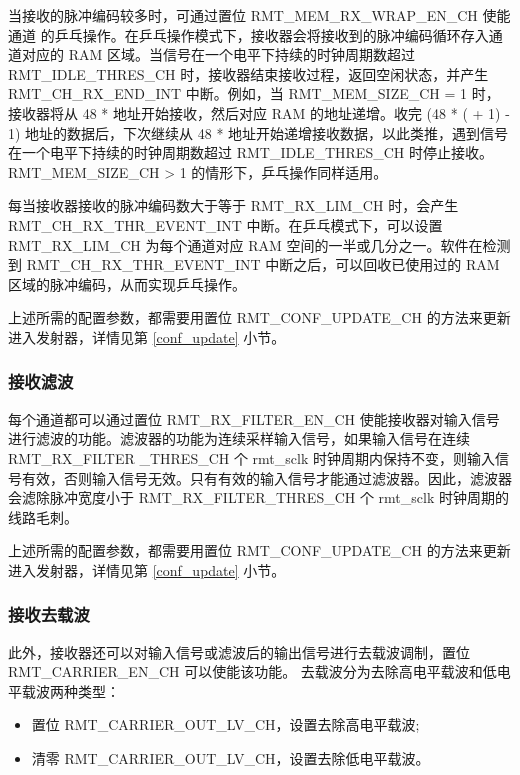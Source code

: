 \documentclass[main\_\_CN.tex]{subfiles}
\begin{document}
当接收的脉冲编码较多时，可通过置位 RMT\_MEM\_RX\_WRAP\_EN\_CH 使能通道  的乒乓操作。在乒乓操作模式下，接收器会将接收到的脉冲编码循环存入通道对应的 RAM 区域。当信号在一个电平下持续的时钟周期数超过 RMT\_IDLE\_THRES\_CH 时，接收器结束接收过程，返回空闲状态，并产生 RMT\_CH\_RX\_END\_INT 中断。例如，当 RMT\_MEM\_SIZE\_CH = 1 时，接收器将从 48 *  地址开始接收，然后对应 RAM 的地址递增。收完 (48 * ( + 1) - 1) 地址的数据后，下次继续从 48 *  地址开始递增接收数据，以此类推，遇到信号在一个电平下持续的时钟周期数超过 RMT\_IDLE\_THRES\_CH 时停止接收。RMT\_MEM\_SIZE\_CH > 1 的情形下，乒乓操作同样适用。

每当接收器接收的脉冲编码数大于等于 RMT\_RX\_LIM\_CH 时，会产生
RMT\_CH\_RX\_THR\_EVENT\_INT 中断。在乒乓模式下，可以设置 RMT\_RX\_LIM\_CH
为每个通道对应 RAM 空间的一半或几分之一。软件在检测到 RMT\_CH\_RX\_THR\_EVENT\_INT
中断之后，可以回收已使用过的 RAM 区域的脉冲编码，从而实现乒乓操作。

上述所需的配置参数，都需要用置位 RMT\_CONF\_UPDATE\_CH 的方法来更新进入发射器，详情见第 \ref{conf_update} 小节。



\subsubsection{接收滤波}

每个通道都可以通过置位 RMT\_RX\_FILTER\_EN\_CH 使能接收器对输入信号进行滤波的功能。滤波器的功能为连续采样输入信号，如果输入信号在连续 RMT\_RX\_FILTER \_THRES\_CH 个 rmt\_sclk 时钟周期内保持不变，则输入信号有效，否则输入信号无效。只有有效的输入信号才能通过滤波器。因此，滤波器会滤除脉冲宽度小于 RMT\_RX\_FILTER\_THRES\_CH 个 rmt\_sclk 时钟周期的线路毛刺。

上述所需的配置参数，都需要用置位 RMT\_CONF\_UPDATE\_CH 的方法来更新进入发射器，详情见第 \ref{conf_update} 小节。

\subsubsection{接收去载波}

此外，接收器还可以对输入信号或滤波后的输出信号进行去载波调制，置位 RMT\_CARRIER\_EN\_CH 可以使能该功能。
去载波分为去除高电平载波和低电平载波两种类型：
\begin{itemize}
    \item 置位 RMT\_CARRIER\_OUT\_LV\_CH，设置去除高电平载波;
    \item 清零 RMT\_CARRIER\_OUT\_LV\_CH，设置去除低电平载波。
\end{itemize}
\end{document}

